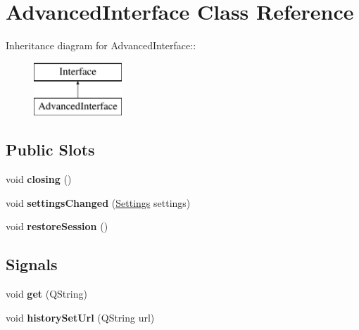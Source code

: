 \hypertarget{classAdvancedInterface}{
\section{AdvancedInterface Class Reference}
\label{classAdvancedInterface}
}
Inheritance diagram for AdvancedInterface::\begin{figure}[H]
\begin{center}
\leavevmode
\includegraphics[height=2cm]{classAdvancedInterface}
\end{center}
\end{figure}
\subsection*{Public Slots}
\begin{DoxyCompactItemize}
\item 
\hypertarget{classAdvancedInterface_a4f6e7117f41f9d43633091d20acc85f8}{
void {\bfseries closing} ()}
\label{classAdvancedInterface_a4f6e7117f41f9d43633091d20acc85f8}

\item 
\hypertarget{classAdvancedInterface_ae22137f0f946dd85e808f24917240369}{
void {\bfseries settingsChanged} (\hyperlink{classSettings}{Settings} settings)}
\label{classAdvancedInterface_ae22137f0f946dd85e808f24917240369}

\item 
\hypertarget{classAdvancedInterface_ae94430b1e4cd09370b735045173b4db5}{
void {\bfseries restoreSession} ()}
\label{classAdvancedInterface_ae94430b1e4cd09370b735045173b4db5}

\end{DoxyCompactItemize}
\subsection*{Signals}
\begin{DoxyCompactItemize}
\item 
\hypertarget{classAdvancedInterface_a68a20613eb2cbf7588259fdaee660e28}{
void {\bfseries get} (QString)}
\label{classAdvancedInterface_a68a20613eb2cbf7588259fdaee660e28}

\item 
\hypertarget{classAdvancedInterface_a860c6b20254fd6114f18bacbf9c04251}{
void {\bfseries historySetUrl} (QString url)}
\label{classAdvancedInterface_a860c6b20254fd6114f18bacbf9c04251}

\end{DoxyCompactItemize}
